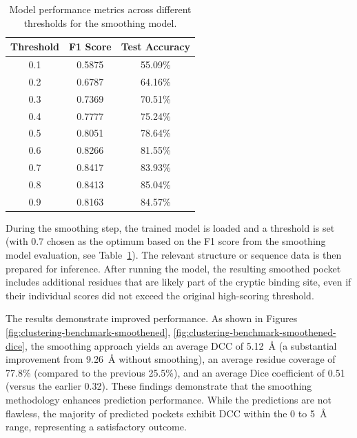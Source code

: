 \begin{table}[htbp]
    \centering
    \caption{Model performance metrics across different thresholds for the smoothing model.}
    \label{tab:smoothing-thresholds}
    \begin{tabular}{c|c|c}
        \hline
        \textbf{Threshold} & \textbf{F1 Score} & \textbf{Test Accuracy} \\
        \hline
        0.1 & 0.5875 & 55.09\% \\
        0.2 & 0.6787 & 64.16\% \\
        0.3 & 0.7369 & 70.51\% \\
        0.4 & 0.7777 & 75.24\% \\
        0.5 & 0.8051 & 78.64\% \\
        0.6 & 0.8266 & 81.55\% \\
        0.7 & 0.8417 & 83.93\% \\
        0.8 & 0.8413 & 85.04\% \\
        0.9 & 0.8163 & 84.57\% \\
        \hline
    \end{tabular}
\end{table}

During the smoothing step, the trained model is loaded and a threshold is set (with 0.7 chosen as the optimum based on the F1 score from the smoothing model evaluation, see Table~\ref{tab:smoothing-thresholds}). The relevant structure or sequence data is then prepared for inference. After running the model, the resulting smoothed pocket includes additional residues that are likely part of the cryptic binding site, even if their individual scores did not exceed the original high-scoring threshold.

The results demonstrate improved performance. As shown in Figures \ref{fig:clustering-benchmark-smoothened}, \ref{fig:clustering-benchmark-smoothened-dice}, the smoothing approach yields an average DCC of 5.12~\AA{} (a substantial improvement from 9.26~\AA{} without smoothing), an average residue coverage of 77.8\% (compared to the previous 25.5\%), and an average Dice coefficient of 0.51 (versus the earlier 0.32). These findings demonstrate that the smoothing methodology enhances prediction performance. While the predictions are not flawless, the majority of predicted pockets exhibit DCC within the 0 to 5~\AA{} range, representing a satisfactory outcome.

